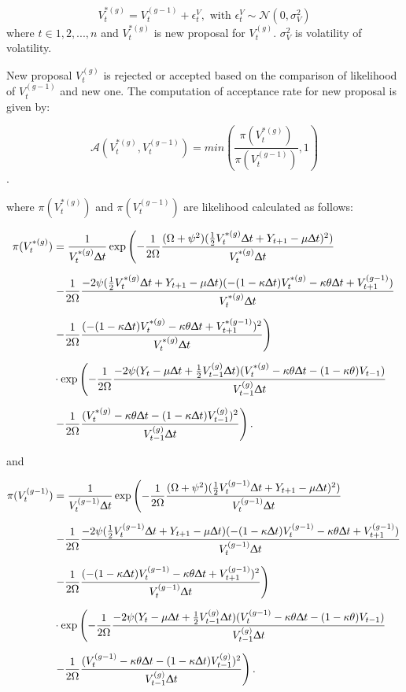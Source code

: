 \documentclass[12pt,a4paper]{article}
\numberwithin{equation}{section}
\begin{document}
\[V_t^{*(g)} = V_t^{(g-1)} + \epsilon_t^V, \text{ with } \epsilon_t^V \sim \mathcal{N}(0, \sigma_V^2)\]
where $t \in {1, 2, ..., n}$ and $V_t^{*(g)}$ is new proposal for $V_t^{(g)}$. $\sigma_V^2$ is volatility of volatility. 

New proposal $V_t^{(g)}$ is rejected or accepted based on the comparison of likelihood of $V_t^{(g-1)}$ and new one. The computation of acceptance rate for new proposal is given by:

\[\mathcal{A}(V_t^{*(g)}, V_t^{(g-1)}) = min \left( \frac{\pi(V_t^{*(g)})}{\pi(V_t^{(g-1)})}, 1 \right)\]. 

where $\pi(V_t^{*(g)})$ and $\pi(V_t^{(g-1)})$ are likelihood calculated as follows:

\begin{align*}
\pi(V_t^{*(g)}) &= \frac{1}{V_t^{*(g)} \Updelta t} \exp \left( -\frac{1}{2 \Omega} \frac{(\Omega + \psi^2)(\frac{1}{2} V_t^{*(g)} \Updelta t + Y_{t+1} - \mu \Updelta t)^2)}{V_t^{*(g)} \Updelta t} \right.\\[0.6em]
& \left. -\frac{1}{2\Omega}\frac{-2\psi (\frac{1}{2}V_t^{*(g)} \Updelta t + Y_{t+1} - \mu \Updelta t)(-(1-\kappa\Updelta t) V_t^{*(g)} -\kappa \theta \Updelta t + V_{t+1}^{(g-1)})}{V_t^{*(g)} \Updelta t} \right.\\[0.6em]
& \left. -\frac{1}{2\Omega}\frac{(-(1-\kappa \Updelta t) V_t^{*(g)} -\kappa \theta \Updelta t + V_{t+1}^{*(g-1)})^2}{V_t^{*(g)} \Updelta t} \right)\\[0.6em]
& \cdot \exp \left( - \frac{1}{2 \Omega} \frac{-2 \psi (Y_t - \mu \Updelta t + \frac{1}{2}V_{t-1}^{(g)} \Updelta t)(V_t^{*(g)} - \kappa \theta \Updelta t - (1-\kappa \theta)V_{t-1})}{V_{t-1}^{(g)} \Updelta t} \right. \\[0.6em]
& \left. -\frac{1}{2 \Omega} \frac{(V_t^{*(g)} - \kappa \theta \Updelta t - (1-\kappa\Updelta t)V_{t-1}^{(g)})^2}{V_{t-1}^{(g)}\Updelta t}\right).
\end{align*}

and 

\begin{align*}
\pi(V_t^{(g-1)}) &= \frac{1}{V_t^{(g-1)} \Updelta t} \exp \left( -\frac{1}{2 \Omega} \frac{(\Omega + \psi^2)(\frac{1}{2} V_t^{(g-1)} \Updelta t + Y_{t+1} - \mu \Updelta t)^2)}{V_t^{(g-1)} \Updelta t} \right.\\[0.6em]
& \left. -\frac{1}{2\Omega}\frac{-2\psi (\frac{1}{2}V_t^{(g-1)} \Updelta t + Y_{t+1} - \mu \Updelta t)(-(1-\kappa\Updelta t) V_t^{(g-1)} -\kappa \theta \Updelta t + V_{t+1}^{(g-1)})}{V_t^{(g-1)} \Updelta t} \right.\\[0.6em]
& \left. -\frac{1}{2\Omega}\frac{(-(1-\kappa \Updelta t) V_t^{(g-1)} -\kappa \theta \Updelta t + V_{t+1}^{(g-1)})^2}{V_t^{(g-1)} \Updelta t} \right)\\[0.6em]
& \cdot \exp \left( - \frac{1}{2 \Omega} \frac{-2 \psi (Y_t - \mu \Updelta t + \frac{1}{2}V_{t-1}^{(g)} \Updelta t)(V_t^{(g-1)} - \kappa \theta \Updelta t - (1-\kappa \theta)V_{t-1})}{V_{t-1}^{(g)} \Updelta t} \right. \\[0.6em]
& \left. -\frac{1}{2 \Omega} \frac{(V_t^{(g-1)} - \kappa \theta \Updelta t - (1-\kappa\Updelta t)V_{t-1}^{(g)})^2}{V_{t-1}^{(g)}\Updelta t}\right).
\end{align*}
\end{document}
